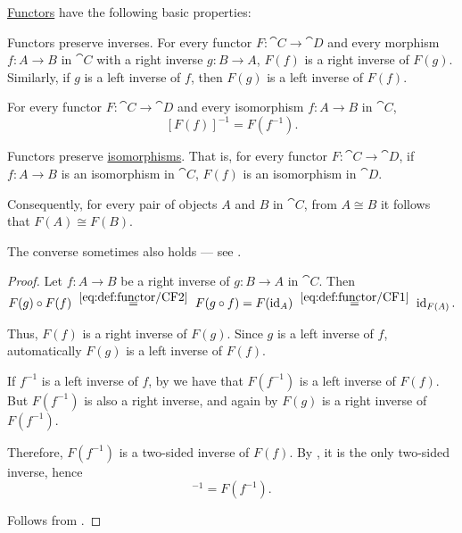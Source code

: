\begin{proposition}\label{thm:def:functor/properties}
  \hyperref[def:functor]{Functors} have the following basic properties:
  \begin{thmenum}
     Functors preserve inverses. For every functor \( F: \cat{C} \to \cat{D} \) and every morphism \( f: A \to B \) in \( \cat{C} \) with a right inverse \( g: B \to A \), \( F(f) \) is a right inverse of \( F(g) \). Similarly, if \( g \) is a left inverse of \( f \), then \( F(g) \) is a left inverse of \( F(f) \).

     For every functor \( F: \cat{C} \to \cat{D} \) and every isomorphism \( f: A \to B \) in \( \cat{C} \),
    \begin{equation}\label{eq:thm:def:functor/inverses}
      [F(f)]^{-1} = F(f^{-1}).
    \end{equation}

     Functors preserve \hyperref[def:morphism_invertibility/isomorphism]{isomorphisms}. That is, for every functor \( F: \cat{C} \to \cat{D} \), if \( f: A \to B \) is an isomorphism in \( \cat{C} \), \( F(f) \) is an isomorphism in \( \cat{D} \).

    Consequently, for every pair of objects \( A \) and \( B \) in \( \cat{C} \), from \( A \cong B \) it follows that \( F(A) \cong F(B) \).

    The converse sometimes also holds --- see .
  \end{thmenum}
\end{proposition}
\begin{proof}
   Let \( f: A \to B \) be a right inverse of \( g: B \to A \) in \( \cat{C} \). Then
  \begin{equation*}
    F(g) \bincirc F(f)
    \reloset {\eqref{eq:def:functor/CF2}} =
    F(g \bincirc f)
    =
    F(\id_A)
    \reloset {\eqref{eq:def:functor/CF1}} =
    \id_{F(A)}.
  \end{equation*}

  Thus, \( F(f) \) is a right inverse of \( F(g) \). Since \( g \) is a left inverse of \( f \), automatically \( F(g) \) is a left inverse of \( F(f) \).

   If \( f^{-1} \) is a left inverse of \( f \), by  we have that \( F(f^{-1}) \) is a left inverse of \( F(f) \). But \( F(f^{-1}) \) is also a right inverse, and again by  \( F(g) \) is a right inverse of \( F(f^{-1}) \).

  Therefore, \( F(f^{-1}) \) is a two-sided inverse of \( F(f) \). By , it is the only two-sided inverse, hence
  \begin{equation*}
    [F(f)]^{-1} = F(f^{-1}).
  \end{equation*}

   Follows from .
\end{proof}

